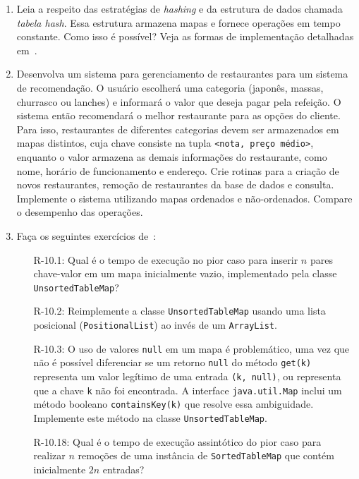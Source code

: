 \begin{enumerate}
	\item Leia a respeito das estratégias de \textit{hashing} e da estrutura de dados chamada \textit{tabela hash}. Essa estrutura armazena mapas e fornece operações em tempo constante. Como isso é possível? Veja as formas de implementação detalhadas em~\cite{GoodrichEtAl2014}.
	
	\item Desenvolva um sistema para gerenciamento de restaurantes para um sistema de recomendação. O usuário escolherá uma categoria (japonês, massas, churrasco ou lanches) e informará o valor que deseja pagar pela refeição. O sistema então recomendará o melhor restaurante para as opções do cliente. Para isso, restaurantes de diferentes categorias devem ser armazenados em mapas distintos, cuja chave consiste na tupla \texttt{<nota, preço médio>}, enquanto o valor armazena as demais informações do restaurante, como nome, horário de funcionamento e endereço. Crie rotinas para a criação de novos restaurantes, remoção de restaurantes da base de dados e consulta. Implemente o sistema utilizando mapas ordenados e não-ordenados. Compare o desempenho das operações.
	
	\item Faça os seguintes exercícios de~\cite{GoodrichEtAl2014}:
	
	\begin{itemize}
		\item[R-10.1:] Qual é o tempo de execução no pior caso para inserir $n$ pares chave-valor em um mapa inicialmente vazio, implementado pela classe \texttt{UnsortedTableMap}?
		
		\item[R-10.2:] Reimplemente a classe \texttt{UnsortedTableMap} usando uma lista posicional (\texttt{PositionalList}) ao invés de um \texttt{ArrayList}.
		
		\item[R-10.3:] O uso de valores \texttt{null} em um mapa é problemático, uma vez que não é possível diferenciar se um retorno \texttt{null} do método \texttt{get(k)} representa um valor legítimo de uma entrada \texttt{(k, null)}, ou representa que a chave \texttt{k} não foi encontrada. A interface \texttt{java.util.Map} inclui um método booleano \texttt{containsKey(k)} que resolve essa ambiguidade. Implemente este método na classe \texttt{UnsortedTableMap}.
		
		\item[R-10.18:] Qual é o tempo de execução assintótico do pior caso para realizar $n$ remoções de uma instância de \texttt{SortedTableMap} que contém inicialmente $2n$ entradas?
		

\end{itemize}
\end{enumerate}
